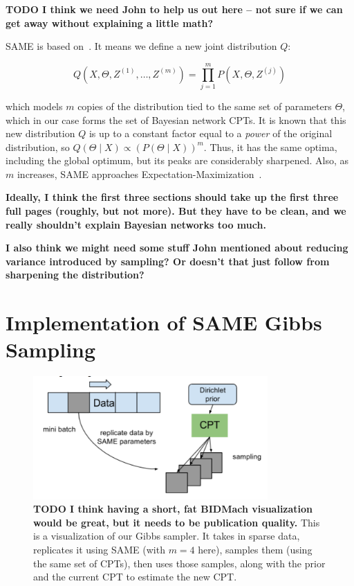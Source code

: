 \documentclass{article} %
\begin{document}
\textbf{TODO I think we need John to help us out here -- not sure if we can get away without
explaining a little math?}

SAME is based on~\citep{SAME2002}. It means we define a new joint distribution $Q$:

\begin{equation}\label{eq:same}
Q(X,\Theta,Z^{(1)},\ldots,Z^{(m)}) = \prod_{j=1}^m P(X,\Theta,Z^{(j)})
\end{equation}

which models $m$ copies of the distribution tied to the same set of parameters $\Theta$, which in
our case forms the set of Bayesian network CPTs. It is known that this new distribution $Q$ is up to
a constant factor equal to a \emph{power} of the original distribution, so $Q(\Theta \mid X) \propto
(P(\Theta \mid X))^m$. Thus, it has the same optima, including the global optimum, but its peaks are
considerably sharpened. Also, as $m$ increases, SAME approaches
Expectation-Maximization~\citep{EMpaper}.

\textbf{Ideally, I think the first three sections should take up the first three full pages
(roughly, but not more). But they have to be clean, and we really shouldn't explain Bayesian
networks too much.}

\textbf{I also think we might need some stuff John mentioned about reducing variance introduced by
sampling? Or doesn't that just follow from sharpening the distribution?}


\section{Implementation of SAME Gibbs Sampling}\label{sec:implementation}

\begin{figure}[t]
\centering
\includegraphics[width=0.8\textwidth]{fig_BIDMach_flow_DRAFT}
\caption{\textbf{TODO I think having a short, fat BIDMach visualization would be great, but it needs
to be publication quality.} This is a visualization of our Gibbs sampler. It takes in sparse data,
replicates it using SAME (with $m=4$ here), samples them (using the same set of CPTs), then uses
those samples, along with the prior and the current CPT to estimate the new CPT.}
\label{fig:BIDMach}
\end{figure}
\end{document}
